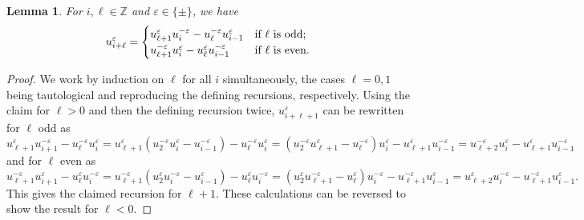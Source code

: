 \documentclass{amsart}
\newtheorem{lemma}[theorem]{Lemma}
\numberwithin{theorem}{section}
\newcommand{\ZZ}{\mathbb{Z}}
\begin{document}
  \begin{lemma}
    For $i,\ell\in\ZZ$ and $\varepsilon\in\{\pm\}$, we have
    \begin{equation}
      \label{eq:long Chebyshev recursion}
      u_{i+\ell}^\varepsilon=\begin{cases} u_{\ell+1}^\varepsilon u_i^{-\varepsilon}-u_\ell^{-\varepsilon} u_{i-1}^\varepsilon & \text{\upshape if $\ell$ is odd;}\\ u_{\ell+1}^{-\varepsilon} u_i^\varepsilon-u_\ell^\varepsilon u_{i-1}^{-\varepsilon} & \text{\upshape if $\ell$ is even.} \end{cases}
    \end{equation}
  \end{lemma}
  \begin{proof}
    We work by induction on $\ell$ for all $i$ simultaneously, the cases $\ell=0,1$ being tautological and reproducing the defining recursions, respectively.
    Using the claim for $\ell>0$ and then the defining recursion twice, $u_{i+\ell+1}^\varepsilon$ can be rewritten for $\ell$ odd as
    \[
      u_{\ell+1}^\varepsilon u_{i+1}^{-\varepsilon}-u_\ell^{-\varepsilon} u_i^\varepsilon
      =u_{\ell+1}^\varepsilon(u_2^{-\varepsilon}u_i^\varepsilon-u_{i-1}^{-\varepsilon}) -u_\ell^{-\varepsilon} u_i^\varepsilon 
      =(u_2^{-\varepsilon} u_{\ell+1}^\varepsilon-u_\ell^{-\varepsilon}) u_i^\varepsilon-u_{\ell+1}^\varepsilon u_{i-1}^{-\varepsilon}
      =u_{\ell+2}^{-\varepsilon} u_i^\varepsilon - u_{\ell+1}^\varepsilon u_{i-1}^{-\varepsilon}
    \]
    and for $\ell$ even as
    \[
      u_{\ell+1}^{-\varepsilon} u_{i+1}^\varepsilon-u_\ell^\varepsilon u_i^{-\varepsilon}
      =u_{\ell+1}^{-\varepsilon}(u_2^\varepsilon u_i^{-\varepsilon}-u_{i-1}^\varepsilon) -u_\ell^\varepsilon u_i^{-\varepsilon}
      =(u_2^\varepsilon u_{\ell+1}^{-\varepsilon}-u_\ell^\varepsilon) u_i^{-\varepsilon}-u_{\ell+1}^{-\varepsilon} u_{i-1}^\varepsilon
      =u_{\ell+2}^\varepsilon u_i^{-\varepsilon}-u_{\ell+1}^{-\varepsilon} u_{i-1}^\varepsilon.
    \]
    This gives the claimed recursion for $\ell+1$.
    These calculations can be reversed to show the result for $\ell<0$.
  \end{proof}
\end{document}

